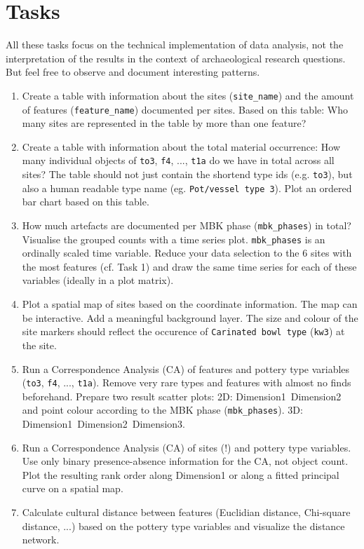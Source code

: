 \documentclass[a3, ruledsections, 8pt]{sciposter}
\begin{document}
\pagebreak

\section{Tasks}

All these tasks focus on the technical implementation of data analysis, not the interpretation of the results in the context of archaeological research questions. But feel free to observe and document interesting patterns.

\begin{enumerate}
\item Create a table with information about the sites (\verb|site_name|) and the amount of features (\verb|feature_name|) documented per sites. Based on this table: Who many sites are represented in the table by more than one feature? 
\item Create a table with information about the total material occurrence: How many individual objects of \verb|to3|, \verb|f4|, ..., \verb|t1a| do we have in total across all sites? The table should not just contain the shortend type ids (e.g. \verb|to3|), but also a human readable type name (eg. \verb|Pot/vessel type 3|). Plot an ordered bar chart based on this table.
\item How much artefacts are documented per MBK phase (\verb|mbk_phases|) in total? Visualise the grouped counts with a time series plot. \verb|mbk_phases| is an ordinally scaled time variable. Reduce your data selection to the 6 sites with the most features (cf. Task 1) and draw the same time series for each of these variables (ideally in a plot matrix).
\item Plot a spatial map of sites based on the coordinate information. The map can be interactive. Add a meaningful background layer. The size and colour of the site markers should reflect the occurence of \verb|Carinated bowl type| (\verb|kw3|) at the site.
\item Run a Correspondence Analysis (CA) of features and pottery type variables (\verb|to3|, \verb|f4|, ..., \verb|t1a|). Remove very rare types and features with almost no finds beforehand. Prepare two result scatter plots: 2D: Dimension1~Dimension2 and point colour according to the MBK phase (\verb|mbk_phases|). 3D: Dimension1~Dimension2~Dimension3.
\item Run a Correspondence Analysis (CA) of sites (!) and pottery type variables. Use only binary presence-absence information for the CA, not object count. Plot the resulting rank order along Dimension1 or along a fitted principal curve on a spatial map.
\item Calculate cultural distance between features (Euclidian distance, Chi-square distance, ...) based on the pottery type variables and visualize the distance network. 
\end{enumerate}
\end{document}
